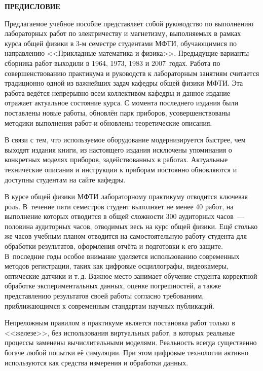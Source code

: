 \clearpage
{\noindent\large\bfseries ПРЕДИСЛОВИЕ}

\vspace{3pc}

Предлагаемое учебное пособие представляет собой руководство по выполнению 
лабораторных работ по электричеству и магнетизму,
выполняемых в рамках курса общей физики в 3-м семестре студентами 
\mbox{МФТИ}, обучающимися по направлению <<Прикладные математика и физика>>. 
Предыдущие варианты сборника работ выходили в 1964, 1973, 1983 и 2007~годах.
Работа по совершенствованию практикума и руководств к лабораторным занятиям
считается традиционно одной из важнейших задач кафедры общей физики МФТИ.
Эта работа ведётся непрерывно всем коллективом кафедры и данное издание 
отражает актуальное состояние курса. С момента последнего издания были 
поставлены новые работы, обновлён парк приборов, усовершенствованы 
методики выполнения работ и обновлены теоретические описания.

В связи с тем, что используемое оборудование модернизируется быстрее,
чем выходят издания книги, из настоящего издания исключены упоминания
о конкретных моделях приборов, задействованных в работах. Актуальные 
технические описания и инструкции к приборам постоянно обновляются
и доступны студентам на сайте кафедры.

В курсе общей физики МФТИ лабораторному практикуму отводится ключевая роль.
В~течение пяти семестров студент выполняет не менее 40 работ, на выполнение
которых отводится в общей сложности 300 аудиторных часов~--- половина 
аудиторных часов, отводимых весь на курс общей физики. Ещё столько же часов учебным планом отводится 
на самостоятельную работу студента для обработки результатов, оформления
отчёта и подготовки к его защите. В~последние годы особое внимание 
уделяется использованию современных методов регистрации, таких как цифровые 
осциллографы, видеокамеры, оптические датчики и т.\,д. Важное место занимает 
обучение студента корректной обработке экспериментальных данных, 
оценке погрешностей, а также представлению результатов своей работы 
согласно требованиям, приближающимся к современным стандартам научных 
публикаций.

Непреложным правилом в практикуме является постановка работ только 
в <<железе>>, без использования виртуальных работ, в которых реальные 
процессы заменены вычислительными моделями. 
Реальность всегда существенно богаче любой попытки её симуляции. 
При этом цифровые технологии активно используются как средства измерения 
и обработки данных.

